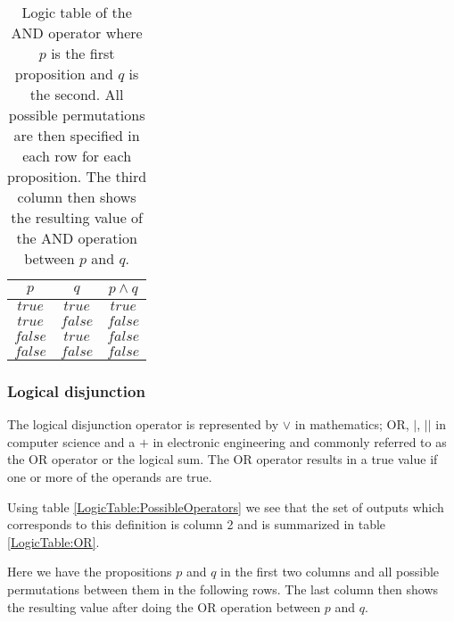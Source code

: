                 \begin{table}[h!]
                    \centering
                    \begin{tabular}{|c|c|c|}
                    	\hline
                    	  $p$   &   $q$   & $p \wedge q$ \\ \hline
                    	$true$  & $true$  &    $true$    \\ \hline
                    	$true$  & $false$ &   $false$    \\ \hline
                    	$false$ & $true$  &   $false$    \\ \hline
                    	$false$ & $false$ &   $false$    \\ \hline
                    \end{tabular}
                    \caption{Logic table of the AND operator where $p$ is the first proposition and $q$ is the second. All possible permutations are then specified in each row for each proposition. The third column then shows the resulting value of the AND operation between $p$ and $q$.}
                    \label{LogicTable:AND}
                \end{table}
            
            \subsubsection{Logical disjunction}
            
                The logical disjunction operator is represented by $\vee$ in mathematics; OR, $\vert$, $\vert \vert$  in computer science and a $+$ in electronic engineering and commonly referred to as the OR operator or the logical sum. The OR operator results in a true value if one or more of the operands are true.
                
                Using table \ref{LogicTable:PossibleOperators} we see that the set of outputs which corresponds to this definition is column 2 and is summarized in table \ref{LogicTable:OR}. 
                
                Here we have the propositions $p$ and $q$ in the first two columns and all possible permutations between them in the following rows. The last column then shows the resulting value after doing the OR operation between $p$ and $q$.
                
